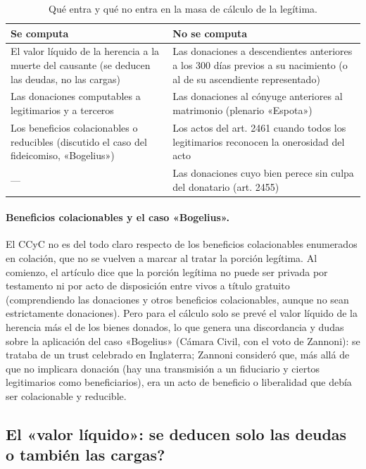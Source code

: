 \documentclass[12pt,oneside]{book}
\begin{document}
\begin{table}[H]
\centering
\small
\begin{tabularx}{\textwidth}{
    >{\raggedright\arraybackslash}X
    >{\raggedright\arraybackslash}X
}
\toprule
\textbf{Se computa} & \textbf{No se computa} \\
\midrule
El valor líquido de la herencia a la muerte del causante (se deducen las deudas, no las cargas) & Las donaciones a descendientes anteriores a los 300 días previos a su nacimiento (o al de su ascendiente representado) \\
\addlinespace
Las donaciones computables a legitimarios y a terceros & Las donaciones al cónyuge anteriores al matrimonio (plenario «Espota») \\
\addlinespace
Los beneficios colacionables o reducibles (discutido el caso del fideicomiso, «Bogelius») & Los actos del art. 2461 cuando todos los legitimarios reconocen la onerosidad del acto \\
\addlinespace
--- & Las donaciones cuyo bien perece sin culpa del donatario (art. 2455) \\
\bottomrule
\end{tabularx}
\caption*{Qué entra y qué no entra en la masa de cálculo de la legítima.}
\end{table}

\paragraph{Beneficios colacionables y el caso «Bogelius».} El CCyC no es del todo claro respecto de los beneficios colacionables enumerados en colación, que no se vuelven a marcar al tratar la porción legítima. Al comienzo, el artículo dice que la porción legítima no puede ser privada por testamento ni por acto de disposición entre vivos a título gratuito (comprendiendo las donaciones y otros beneficios colacionables, aunque no sean estrictamente donaciones). Pero para el cálculo solo se prevé el valor líquido de la herencia más el de los bienes donados, lo que genera una discordancia y dudas sobre la aplicación del caso «Bogelius» (Cámara Civil, con el voto de Zannoni): se trataba de un trust celebrado en Inglaterra; Zannoni consideró que, más allá de que no implicara donación (hay una transmisión a un fiduciario y ciertos legitimarios como beneficiarios), era un acto de beneficio o liberalidad que debía ser colacionable y reducible.

\subsection{El «valor líquido»: \textquestiondown{}se deducen solo las deudas o también las cargas?}
\end{document}
